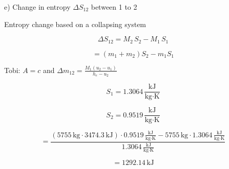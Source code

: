 e) Change in entropy \( \Delta S_{12} \) between 1 to 2

Entropy change based on a collapsing system

\[ \Delta S_{12} = M_2 \, S_2 - M_1 \, S_1 \]

\[ = (m_1 + m_2) S_2 - m_1 S_1 \]

Tobi: \( A = c \) and \( \Delta m_{12} = \frac{M_1 (u_2 - u_1)}{h_e - u_2} \)

\[ S_1 = 1.3064 \, \frac{\text{kJ}}{\text{kg} \cdot \text{K}} \]

\[ S_2 = 0.9519 \, \frac{\text{kJ}}{\text{kg} \cdot \text{K}} \]

\[ = \frac{(5755 \, \text{kg} \cdot 3474.3 \, \text{kJ}) \cdot 0.9519 \, \frac{\text{kJ}}{\text{kg} \cdot \text{K}} - 5755 \, \text{kg} \cdot 1.3064 \, \frac{\text{kJ}}{\text{kg} \cdot \text{K}}}{1.3064 \, \frac{\text{kJ}}{\text{kg} \cdot \text{K}}} \]

\[ = 1292.14 \, \text{kJ} \]